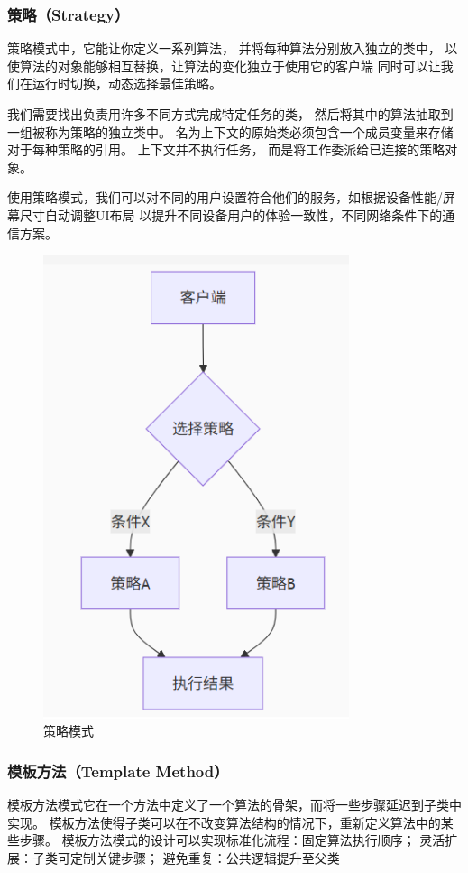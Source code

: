 \documentclass[12pt]{ctexart} %
\begin{document}
\subsubsection{策略（Strategy）} 
策略模式中，它能让你定义一系列算法， 
并将每种算法分别放入独立的类中， 以使算法的对象能够相互替换，让算法的变化独立于使用它的客户端
同时可以让我们在运行时切换，动态选择最佳策略。

我们需要找出负责用许多不同方式完成特定任务的类， 然后将其中的算法抽取到一组被称为策略的独立类中。
名为上下文的原始类必须包含一个成员变量来存储对于每种策略的引用。 上下文并不执行任务， 
而是将工作委派给已连接的策略对象。

使用策略模式，我们可以对不同的用户设置符合他们的服务，如根据设备性能/屏幕尺寸自动调整UI布局
以提升不同设备用户的体验一致性，不同网络条件下的通信方案。

\begin{figure}[H]
  \centering
  \includegraphics[width=0.8\textwidth]{celv.png}
  \caption{策略模式}
\end{figure}

\subsubsection{模板方法（Template Method）} 
模板方法模式它在一个方法中定义了一个算法的骨架，而将一些步骤延迟到子类中实现。
模板方法使得子类可以在不改变算法结构的情况下，重新定义算法中的某些步骤。
模板方法模式的设计可以实现标准化流程：固定算法执行顺序；
灵活扩展：子类可定制关键步骤；
避免重复：公共逻辑提升至父类
\end{document}
